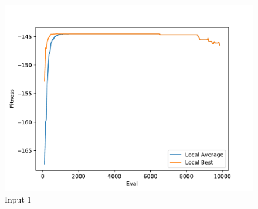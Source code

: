\documentclass{standalone}
\begin{document}
\begin{figure}[!htb]
	\caption{Input 1}
	\label{fig:graph_1044}
	\includegraphics[width=\textwidth]{../graphs/graphs/1044.pdf}
\end{figure}
\end{document}
